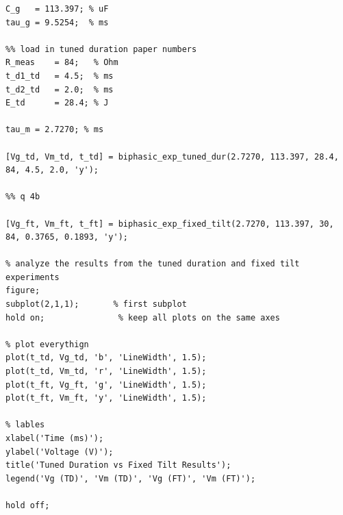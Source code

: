 \documentclass[]{report}
\begin{document}
\begin{lstlisting}[style=Matlab-editor, backgroundcolor=\color{smoky},  basicstyle=\ttfamily\tiny]
%% load in previously found C-g tau-g
C_g   = 113.397; % uF
tau_g = 9.5254;  % ms

%% load in tuned duration paper numbers
R_meas    = 84;   % Ohm
t_d1_td   = 4.5;  % ms
t_d2_td   = 2.0;  % ms
E_td      = 28.4; % J

tau_m = 2.7270; % ms

[Vg_td, Vm_td, t_td] = biphasic_exp_tuned_dur(2.7270, 113.397, 28.4, 84, 4.5, 2.0, 'y');

%% q 4b

[Vg_ft, Vm_ft, t_ft] = biphasic_exp_fixed_tilt(2.7270, 113.397, 30, 84, 0.3765, 0.1893, 'y');

% analyze the results from the tuned duration and fixed tilt experiments
figure;
subplot(2,1,1);       % first subplot
hold on;               % keep all plots on the same axes

% plot everythign
plot(t_td, Vg_td, 'b', 'LineWidth', 1.5);
plot(t_td, Vm_td, 'r', 'LineWidth', 1.5);
plot(t_ft, Vg_ft, 'g', 'LineWidth', 1.5);
plot(t_ft, Vm_ft, 'y', 'LineWidth', 1.5);

% lables
xlabel('Time (ms)');
ylabel('Voltage (V)');
title('Tuned Duration vs Fixed Tilt Results');
legend('Vg (TD)', 'Vm (TD)', 'Vg (FT)', 'Vm (FT)');

hold off;
\end{lstlisting}
\end{document}
